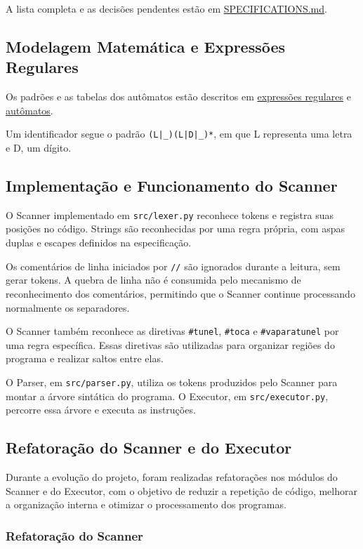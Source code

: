 \documentclass[12pt,a4paper]{article}
\begin{document}
A lista completa e as decisões pendentes estão em \href{../markdown/SPECIFICATIONS.md}{SPECIFICATIONS.md}.


\subsection{Modelagem Matemática e Expressões Regulares}

Os padrões e as tabelas dos autômatos estão descritos em \href{../markdown/REGULAR_EXPRESSIONS.md}{expressões regulares} e \href{../markdown/AUTOMATA.md}{autômatos}.

Um identificador segue o padrão \texttt{(L|\_)(L|D|\_)*}, em que L representa uma letra e D, um dígito.


\subsection{Implementação e Funcionamento do Scanner}

O Scanner implementado em \texttt{src/lexer.py} reconhece tokens e registra suas posições no código. Strings são reconhecidas por uma regra própria, com aspas duplas e escapes definidos na especificação.

Os comentários de linha iniciados por \texttt{//} são ignorados durante a leitura, sem gerar tokens. A quebra de linha não é consumida pelo mecanismo de reconhecimento dos comentários, permitindo que o Scanner continue processando normalmente os separadores.

O Scanner também reconhece as diretivas \texttt{\#tunel}, \texttt{\#toca} e \texttt{\#vaparatunel} por uma regra específica. Essas diretivas são utilizadas para organizar regiões do programa e realizar saltos entre elas.

O Parser, em \texttt{src/parser.py}, utiliza os tokens produzidos pelo Scanner para montar a árvore sintática do programa. O Executor, em \texttt{src/executor.py}, percorre essa árvore e executa as instruções.


\subsection{Refatoração do Scanner e do Executor}

Durante a evolução do projeto, foram realizadas refatorações nos módulos do Scanner e do Executor, com o objetivo de reduzir a repetição de código, melhorar a organização interna e otimizar o processamento dos programas.

\subsubsection{Refatoração do Scanner}
\end{document}
